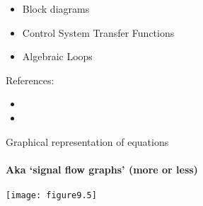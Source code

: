 \documentclass{beamer-control}
\begin{document}

\begin{SUMMARY}
\begin{itemize}
\item Block diagrams
\item Control System Transfer Functions
\item Algebraic Loops
\end{itemize}
\vfill References:
\begin{itemize}
\item {}
\item {}
\end{itemize}
\end{SUMMARY}




\begin{frame}{Graphical representation of equations}
\framesubtitle{Aka `signal flow graphs' (more or less)}

\vfill
\texttt{[image: figure9.5]}

\end{frame}
\end{document}
